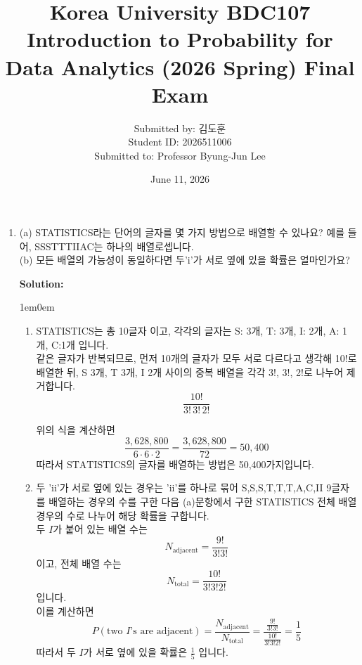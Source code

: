 \documentclass{article}
\title{Korea University BDC107
Introduction to Probability for Data Analytics (2026 Spring)
Final Exam}
\author{
Submitted by: 김도훈 \\
Student ID: 2026511006 \\
Submitted to: Professor Byung-Jun Lee}
\date{June 11, 2026}
\newenvironment{solution}
{
    \par\medskip
    \noindent\textbf{Solution:}
    \begin{adjustwidth}{1em}{0em}
}
{
    \end{adjustwidth}
    \medskip
}
\begin{document}
\maketitle

\begin{enumerate}[label=\textbf{\arabic*.}, leftmargin=*]

\item (a) STATISTICS라는 단어의 글자를 몇 가지 방법으로 배열할 수 있나요? 예를 들어, SSSTTTIIAC는 하나의 배열로셉니다.\\
(b) 모든 배열의 가능성이 동일하다면 두'i'가 서로 옆에 있을 확률은 얼마인가요?

    \begin{solution}
        \begin{enumerate}[label=(\alph*), leftmargin=2em, itemsep=1em]
        
            \item  STATISTICS는 총 10글자 이고,  각각의 글자는 S: 3개, T: 3개, I: 2개, A: 1개, C:1개 입니다.\\
            같은 글자가 반복되므로, 먼저 10개의 글자가 모두 서로 다르다고 생각해 10!로 배열한 뒤, S 3개, T 3개, I 2개 사이의 중복 배열을 각각 3!, 3!, 2!로 나누어 제거합니다.
            $$
            \frac{10!}{3!\,3!\,2!}
            $$
            
            위의 식을 계산하면
            $$
            \frac{3{,}628{,}800}{6\cdot 6\cdot 2}
            =\frac{3{,}628{,}800}{72}
            =50{,}400
            $$
            따라서 $\mathrm{STATISTICS}$의 글자를 배열하는 방법은 50,400가지입니다.
    
            \item 두 'ii'가 서로 옆에 있는 경우는 'ii'를 하나로 묶어 S,S,S,T,T,T,A,C,II 9글자를 배열하는 경우의 수를 구한 다음 (a)문항에서 구한 STATISTICS 전체 배열 경우의 수로 나누어 해당 확률을 구합니다.\\
            두 $I$가 붙어 있는 배열 수는  
            $$  
            N_{\mathrm{adjacent}}=\frac{9!}{3!3!}  
            $$  
            이고, 전체 배열 수는  
            $$  
            N_{\mathrm{total}}=\frac{10!}{3!3!2!}  
            $$  
            입니다.\\
            이를 계산하면  
            $$  
            P(\text{two } I\text{'s are adjacent})=\frac{N_{\mathrm{adjacent}}}{N_{\mathrm{total}}}=\frac{\frac{9!}{3!3!}}{\frac{10!}{3!3!2!}}=\frac{1}{5}  
            $$  
            따라서 두 $I$가 서로 옆에 있을 확률은  $\frac{1}{5}$ 입니다.
    

\end{enumerate}
\end{solution}
\end{enumerate}
\end{document}
